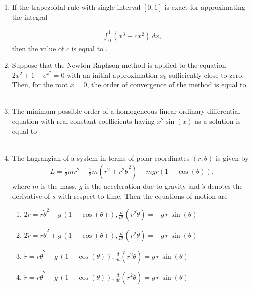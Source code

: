 \documentclass[journal]{IEEEtran}
\numberwithin{equation}{enumi}
\numberwithin{figure}{enumi}
\begin{document}
\begin{enumerate}
\item If the trapezoidal rule with single interval $[0,1]$ is exact for approximating the integral

\begin{align*}
\int_{0}^{1} (x^3 - c x^2) \, dx,
\end{align*}
then the value of $c$ is equal to \underline{\hspace{2cm}}.   \hfill{}
\vspace{1em}

\item Suppose that the Newton-Raphson method is applied to the equation $2x^2 + 1 - e^{x^2} = 0$ with an initial approximation $x_0$ sufficiently close to zero. Then, for the root $x = 0$, the order of convergence of the method is equal to \underline{\hspace{2cm}}\\ .  \hfill{}

\item The minimum possible order of a homogeneous linear ordinary differential equation with real constant coefficients having $x^2 \sin(x)$ as a solution is equal to \underline{\hspace{2cm}} \\
. \hfill{}
\vspace{1em}

\item The Lagrangian of a system in terms of polar coordinates $(r, \theta)$ is given by
\begin{align*}
L = \frac{1}{2} m r^2 + \frac{1}{2} m ( r^2 + r^2 \dot{\theta}^2 ) - m g r ( 1 - \cos(\theta) ),
\end{align*}
where $m$ is the mass, $g$ is the acceleration due to gravity and $\dot{s}$ denotes the derivative of $s$ with respect to time. Then the equations of motion are
\hfill{}
\begin{enumerate}
\item  $ 2 \ddot{r} = r \dot{\theta}^2 - g\, (1 - \cos(\theta)), \frac{d}{dt}(r^2 \dot{\theta}) = -g\, r\, \sin(\theta)$ 
\item   $2 \ddot{r} = r \dot{\theta}^2 + g\, (1 - \cos(\theta)),  \frac{d}{dt}(r^2 \dot{\theta}) = -g\, r\, \sin(\theta)$ 
\item   $\ddot{r} = r \dot{\theta}^2 - g\, (1 - \cos(\theta)),  \frac{d}{dt}(r^2 \dot{\theta}) = g\, r\, \sin(\theta)$ 
\item  $\ddot{r} = r \dot{\theta}^2 + g\, (1 - \cos(\theta)),  \frac{d}{dt}(r^2 \dot{\theta}) = g\, r\, \sin(\theta)$
\end{enumerate}



\end{enumerate}
\end{document}
